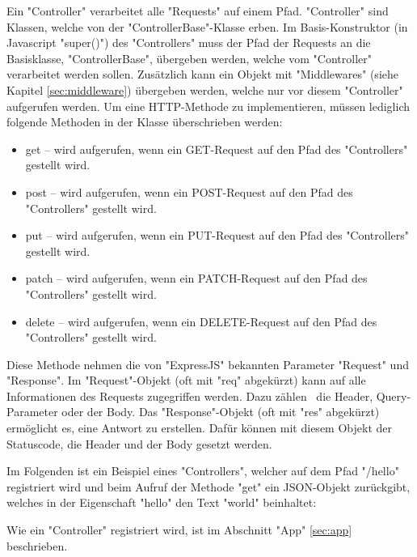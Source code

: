 \label{sec:controller}

Ein "Controller" verarbeitet alle "Requests" auf einem Pfad. 
"Controller" sind Klassen, welche von der "ControllerBase"-Klasse erben. 
Im Basis-Konstruktor (in Javascript "{\ttfamily super()}") des "Controllers" muss der Pfad der Requests an die Basisklasse, "ControllerBase", übergeben werden, welche vom "Controller" verarbeitet werden sollen. 
Zusätzlich kann ein Objekt mit "Middlewares" (siehe Kapitel \ref{sec:middleware}) übergeben werden, welche nur vor diesem "Controller" aufgerufen werden. 
Um eine HTTP-Methode zu implementieren, müssen lediglich folgende Methoden in der Klasse überschrieben werden:

\begin{itemize}
    \item {\ttfamily get} -- wird aufgerufen, wenn ein GET-Request auf den Pfad des "Controllers" gestellt wird.
    \item {\ttfamily post} -- wird aufgerufen, wenn ein POST-Request auf den Pfad des "Controllers" gestellt wird.
    \item {\ttfamily put} -- wird aufgerufen, wenn ein PUT-Request auf den Pfad des "Controllers" gestellt wird.
    \item {\ttfamily patch} -- wird aufgerufen, wenn ein PATCH-Request auf den Pfad des "Controllers" gestellt wird.
    \item {\ttfamily delete} -- wird aufgerufen, wenn ein DELETE-Request auf den Pfad des "Controllers" gestellt wird.
\end{itemize}

Diese Methode nehmen die von "ExpressJS" bekannten Parameter "Request" und "Response". 
Im "Request"-Objekt (oft mit "req" abgekürzt) kann auf alle Informationen des Requests zugegriffen werden. Dazu zählen \zb\ die Header, Query-Parameter oder der Body.
Das "Response"-Objekt (oft mit "res" abgekürzt) ermöglicht es, eine Antwort zu erstellen. Dafür können mit diesem Objekt der Statuscode, die Header und der Body gesetzt werden.


Im Folgenden ist ein Beispiel eines "Controllers", welcher auf dem Pfad "/hello" registriert wird und beim Aufruf der Methode "get" ein JSON-Objekt zurückgibt, welches in der Eigenschaft "hello" den Text "world" beinhaltet:


Wie ein "Controller" registriert wird, ist im Abschnitt "App" \ref{sec:app} beschrieben. 